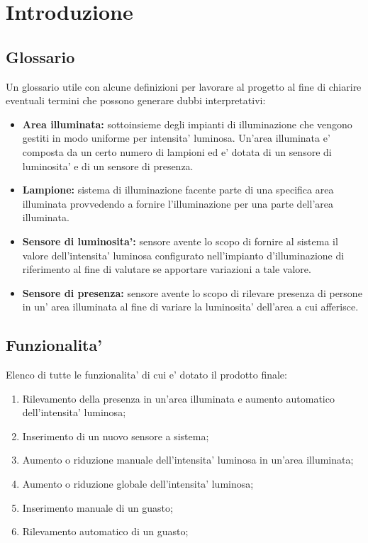 \chapter{Introduzione}

\section{Glossario}
Un glossario utile con alcune definizioni per lavorare al progetto al fine di chiarire eventuali termini che possono generare
dubbi interpretativi:
\begin{itemize}
    \item \textbf{Area illuminata:} sottoinsieme degli impianti di illuminazione che vengono gestiti in
modo uniforme per intensita' luminosa. Un'area illuminata e' composta da un certo numero di lampioni ed e' dotata di un sensore 
di luminosita' e di un sensore di presenza.
    \item \textbf{Lampione:} sistema di illuminazione facente parte di una specifica area illuminata provvedendo a fornire 
    l'illuminazione per una parte dell'area illuminata.
    \item \textbf{Sensore di luminosita':} sensore avente lo scopo di fornire al sistema il valore dell'intensita' luminosa 
    configurato nell'impianto d'illuminazione di riferimento al fine di valutare se apportare variazioni a tale valore.
    \item \textbf{Sensore di presenza:} sensore avente lo scopo di rilevare presenza di persone in un' area illuminata al fine 
    di variare la luminosita' dell'area a cui afferisce.
\end{itemize}

\section{Funzionalita'}
Elenco di tutte le funzionalita' di cui e' dotato il prodotto finale:
\begin{enumerate}
    \item Rilevamento della presenza in un’area illuminata e aumento automatico dell’intensita' luminosa;
    \item Inserimento di un nuovo sensore a sistema;
    \item Aumento o riduzione manuale dell’intensita' luminosa in un’area illuminata;
    \item Aumento o riduzione globale dell’intensita' luminosa;
    \item Inserimento manuale di un guasto;
    \item Rilevamento automatico di un guasto;
\end{enumerate}
